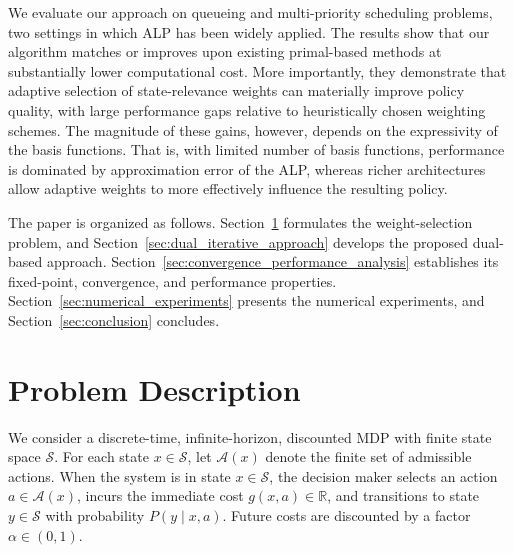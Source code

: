 \documentclass[sglanonrev]{informs4}
\def\edits#1{{\color{black}#1}}
\begin{document}
\edits{We evaluate our approach on queueing and multi-priority scheduling problems, two settings in which \ac{ALP} has been widely applied. The results show that our algorithm matches or improves upon existing primal-based methods at substantially lower computational cost. More importantly, they demonstrate that adaptive selection of state-relevance weights can materially improve policy quality, with large performance gaps relative to heuristically chosen weighting schemes. The magnitude of these gains, however, depends on the expressivity of the basis functions. That is, with limited number of basis functions, performance is dominated by approximation error of the ALP, whereas richer architectures allow adaptive weights to more effectively influence the resulting policy.
}

\edits{The paper is organized as follows. Section~\ref{sec:problem_description} formulates the weight-selection problem, and Section~\ref{sec:dual_iterative_approach} develops the proposed dual-based approach. Section~\ref{sec:convergence_performance_analysis} establishes its fixed-point, convergence, and performance properties. Section~\ref{sec:numerical_experiments} presents the numerical experiments, and Section~\ref{sec:conclusion} concludes.}


\section{Problem Description}
\label{sec:problem_description}

We consider a discrete-time, infinite-horizon, discounted MDP with finite state space $\mathcal S$. For each state $x\in\mathcal S$, let $\mathcal A(x)$ denote the finite set of admissible actions. When the system is in state $x \in \mathcal S$, the decision maker selects an action $a \in \mathcal A(x)$, incurs the immediate cost $g(x,a) \in \mathbb{R}$, and transitions to state $y\in\mathcal S$ with probability $P(y\mid x,a)$. Future costs are discounted by a factor $\alpha\in(0,1)$. 
\end{document}
